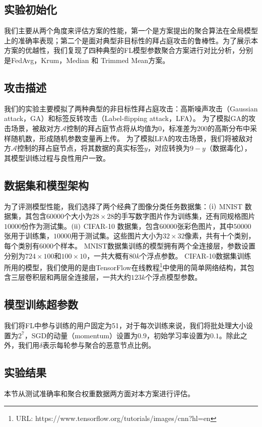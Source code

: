 \subsection{实验初始化}
我们主要从两个角度来评估方案的性能，第一个是方案提出的聚合算法在全局模型上的准确率表现；第二个是面对典型非目标性的拜占庭攻击的鲁棒性。为了展示本方案的优越性，我们复现了四种典型的FL模型参数聚合方案进行对比分析，分别是FedAvg，Krum，Median 和 Trimmed Mean方案。

\subsection{攻击描述}
我们的实验主要模拟了两种典型的非目标性拜占庭攻击：高斯噪声攻击（Gaussian attack，GA）和标签反转攻击（Label-flipping attack，LFA）。
为了模拟GA的攻击场景，被敌对方$\mathcal{A}$控制的拜占庭节点将从均值为0，标准差为200的高斯分布中采样随机数，形成随机参数变量再上传。
为了模拟LFA的攻击场景，我们将被敌对方$\mathcal{A}$控制的拜占庭节点，将其数据的真实标签$y$，对应转换为$9-y$（数据毒化），其模型训练过程与良性用户一致。

\subsection{数据集和模型架构}
为了评测模型性能，我们选择了两个经典了图像分类任务数据集：$(\rm \romannumeral1)$ MNIST 数据集，其包含$ 60000 $个大小为$28 \times 28$的手写数字图片作为训练集，还有同规格图片$10000$份作为测试集。$(\rm \romannumeral2)$ CIFAR-10 数据集，包含$60000$张彩色图片，其中$50000$张用于训练集，$10000$用于测试集。这些图片大小为$32\times 32$像素，共有十个类别，每个类别有$6000$个样本。
MNIST数据集训练的模型拥有两个全连接层，参数设置分别为$724 \times 100$和$100 \times 10$，一共大概有$80k$个浮点参数。
CIFAR-10数据集训练所用的模型，我们使用的是由TensorFlow在线教程\footnote{URL: https://www.tensorflow.org/tutorials/images/cnn?hl=en}中使用的简单网络结构，其包含三层卷积层和两层全连接层，一共大约$123k$个浮点模型参数。

\subsection{模型训练超参数}
我们将FL中参与训练的用户固定为51，对于每次训练来说，我们将批处理大小设置为$2^7$，SGD的动量（momentum）设置为$0.9$，初始学习率设置为$0.1$。除此之外，我们用$\delta$表示每轮参与聚合的恶意节点比例。

\subsection{实验结果}
本节从测试准确率和聚合权重数据两方面对本方案进行评估。

